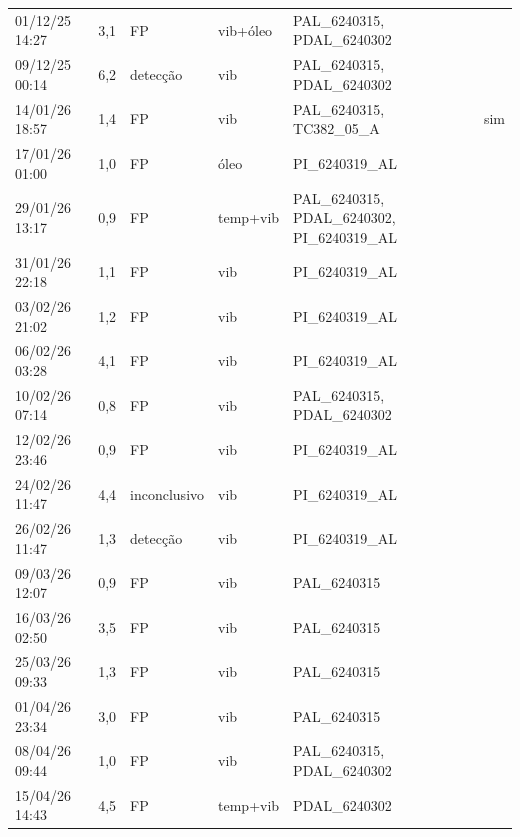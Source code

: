 \begin{longtable}{llll >{\raggedright\arraybackslash}p{6.2cm} l}
01/12/25 14:27 & 3,1 & FP & vib+óleo & PAL\_6240315, PDAL\_6240302 &  \\
09/12/25 00:14 & 6,2 & detecção & vib & PAL\_6240315, PDAL\_6240302 &  \\
14/01/26 18:57 & 1,4 & FP & vib & PAL\_6240315, TC382\_05\_A & sim \\
17/01/26 01:00 & 1,0 & FP & óleo & PI\_6240319\_AL &  \\
29/01/26 13:17 & 0,9 & FP & temp+vib & PAL\_6240315, PDAL\_6240302, PI\_6240319\_AL &  \\
31/01/26 22:18 & 1,1 & FP & vib & PI\_6240319\_AL &  \\
03/02/26 21:02 & 1,2 & FP & vib & PI\_6240319\_AL &  \\
06/02/26 03:28 & 4,1 & FP & vib & PI\_6240319\_AL &  \\
10/02/26 07:14 & 0,8 & FP & vib & PAL\_6240315, PDAL\_6240302 &  \\
12/02/26 23:46 & 0,9 & FP & vib & PI\_6240319\_AL &  \\
24/02/26 11:47 & 4,4 & inconclusivo & vib & PI\_6240319\_AL &  \\
26/02/26 11:47 & 1,3 & detecção & vib & PI\_6240319\_AL &  \\
09/03/26 12:07 & 0,9 & FP & vib & PAL\_6240315 &  \\
16/03/26 02:50 & 3,5 & FP & vib & PAL\_6240315 &  \\
25/03/26 09:33 & 1,3 & FP & vib & PAL\_6240315 &  \\
01/04/26 23:34 & 3,0 & FP & vib & PAL\_6240315 &  \\
08/04/26 09:44 & 1,0 & FP & vib & PAL\_6240315, PDAL\_6240302 &  \\
15/04/26 14:43 & 4,5 & FP & temp+vib & PDAL\_6240302 &  \\
\bottomrule
\end{longtable}
